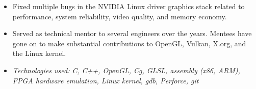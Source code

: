 \begin{itemize}





\item Fixed multiple bugs in the NVIDIA Linux driver graphics stack related to
      performance, system reliability, video quality, and memory economy.

\item Served as technical mentor to several engineers over the years. Mentees
      have gone on to make substantial contributions to OpenGL, Vulkan, X.org,
      and the Linux kernel.

\item \textit{Technologies used: C, C++, OpenGL, Cg, GLSL, assembly (x86, ARM),
      FPGA hardware emulation, Linux kernel, gdb, Perforce, git}

\end{itemize}
